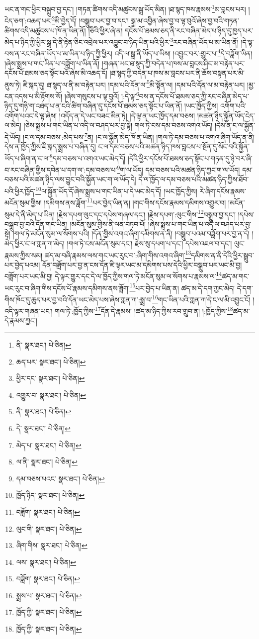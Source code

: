 ཡང་ན་གང་ཕྱིར་བསྒྲུབ་བྱ་དང་། །གཏན་ཚིགས་འདི་མཚུངས་སྒྲ་ཡོད་མིན། །ཐ་སྙད་ཁས་རྣམས་\footnote{ནི་  སྣར་ཐང་།  པེ་ཅིན། }མ་བླངས་པར། །ངེད་ཅག་:འཆད་པར་\footnote{ཆད་པར་  སྣར་ཐང་།  པེ་ཅིན། }མི་བྱེད་དོ། །བསྒྲུབ་པར་བྱ་བ་དང་། སྒྲ་མ་འབྱིན་ཞེས་བྱ་བ་ལྟ་བུའོ་ཞེས་བྱ་བའི་གཏན་ཚིགས་འདི་མཚུངས་པ་ཁོ་ན་ཡིན་ནོ། །ཅིའི་ཕྱིར་ཞེ་ན། དངོས་པོ་ཐམས་ཅད་ནི་རང་བཞིན་མེད་པ་ཉིད་དུ་ཁྱད་པར་མེད་པ་ཉིད་ཀྱི་ཕྱིར་སྒྲ་དེ་ནི་རྟེན་ཅིང་འབྲེལ་པར་འབྱུང་བ་ཉིད་ཡིན་པའི་ཕྱིར་\footnote{ཕྱིར་དང་  སྣར་ཐང་།  པེ་ཅིན། }རང་བཞིན་ཡོད་པ་མ་ཡིན་ནོ། །དེ་ལྟ་བས་ན་རང་བཞིན་ཡོད་པ་མ་ཡིན་པ་ཉིད་ཀྱི་ཕྱིར། འདི་ལ་སྒྲ་ནི་ཡོད་པ་ཡིས། །འབྱུང་བར་:གྱུར་པ་\footnote{འགྱུར་བ་  སྣར་ཐང་།  པེ་ཅིན། }དེ་བཟློག་ཡིན། །ཞེས་སྨྲས་པ་གང་ཡིན་པ་བཟློག་པ་ཡིན་ནོ། །གཞན་ཡང་ཐ་སྙད་ཀྱི་བདེན་པ་ཁས་མ་བླངས་ཤིང་མ་བརྟེན་པར་དངོས་པོ་ཐམས་ཅད་སྟོང་པའོ་ཞེས་མི་འཆད་དོ། །ཐ་སྙད་ཀྱི་བདེན་པ་ཁས་མ་བླངས་པར་ནི་ཆོས་བསྟན་པར་མི་ནུས་ཏེ། ཇི་སྐད་དུ། ཐ་སྙད་ལ་ནི་མ་བརྟེན་པར། །དམ་པའི་དོན་ལ་\footnote{ནི་  སྣར་ཐང་།  པེ་ཅིན། }མི་སྟོན་ལ། །དམ་པའི་དོན་ལ་མ་བརྟེན་པར། །མྱ་ངན་འདས་པ་མི་རྟོགས་སོ། །ཞེས་གསུངས་པ་ལྟ་བུའོ། །:དེ་ལྟ་\footnote{དེ་  སྣར་ཐང་།  པེ་ཅིན། }བས་ན་དངོས་པོ་ཐམས་ཅད་ཀྱི་རང་བཞིན་མེད་པ་ཉིད་དུ་གཉི་ག་འཐད་པ་ན་ངའི་ཚིག་བཞིན་དུ་དངོས་པོ་ཐམས་ཅད་སྟོང་པ་ཡིན་ནོ། །ཡང་ཁྱོད་ཀྱིས། འགོག་པའི་འགོག་པའང་དེ་ལྟ་ཞེས། །འདོད་ན་དེ་ཡང་བཟང་མིན་ཏེ། །དེ་ལྟ་ན་ཡང་ཁྱོད་དམ་བཅས། །མཚན་ཉིད་སྐྱོན་ཡོད་ངེད་ལ་མེད། །ཅེས་སྨྲས་པ་གང་ཡིན་པ་འདི་ལ་བཤད་པར་བྱ་སྟེ། གལ་ཏེ་ངས་དམ་བཅས་འགའ་ཡོད། །དེས་ན་ང་ལ་སྐྱོན་དེ་ཡོད། །ང་ལ་དམ་བཅས་:མེད་པས་\footnote{མེད་པ་  སྣར་ཐང་།  པེ་ཅིན། }ན། །ང་ལ་སྐྱོན་མེད་ཁོ་ན་ཡིན། །གལ་ཏེ་དམ་བཅས་པ་འགའ་ཞིག་ཡོད་ན་ནི། དེས་ན་ཁྱོད་ཀྱིས་ཇི་སྐད་སྨྲས་པ་བཞིན་དུ། ང་ལ་དམ་བཅས་པའི་མཚན་ཉིད་ཁས་བླངས་པ་སྔོན་དུ་སོང་བའི་སྐྱོན་ཡོད་པ་ཞིག་ན་ང་ལ་\footnote{ལ་ནི་  སྣར་ཐང་།  པེ་ཅིན། }དམ་བཅས་པ་འགའ་ཡང་མེད་དོ། །དེའི་ཕྱིར་དངོས་པོ་ཐམས་ཅད་སྟོང་པ་གཏན་དུ་ཉེ་བར་ཞི་བ་རང་བཞིན་གྱིས་དབེན་པ་དག་ལ་:དམ་བཅས་པ་\footnote{དམ་བཅས་པའང་  སྣར་ཐང་།  པེ་ཅིན། }ག་ལ་ཡོད། དམ་བཅས་པའི་མཚན་ཉིད་ཀྱང་ག་ལ་ཡོད། དམ་བཅས་པའི་མཚན་ཉིད་ལས་བྱུང་བའི་སྐྱོན་ཡང་ག་ལ་ཡོད་དེ། དེ་ལ་ཁྱོད་ལ་དམ་བཅས་པའི་མཚན་ཉིད་ཀྱིས་ཐོབ་པའི་ཕྱིར་ཁྱོད་\footnote{ཁྱོད་ཉིད་  སྣར་ཐང་།  པེ་ཅིན། }ལ་སྐྱོན་ཡོད་དོ་ཞེས་སྨྲས་པ་གང་ཡིན་པ་དེ་ཡང་མེད་དོ། །ཡང་ཁྱོད་ཀྱིས། རེ་ཞིག་དངོས་རྣམས་མངོན་སུམ་གྱིས། །དམིགས་ནས་ཟློག་\footnote{བཟློག་  སྣར་ཐང་།  པེ་ཅིན། }པར་བྱེད་ཡིན་ན། །གང་གིས་དངོས་རྣམས་དམིགས་འགྱུར་བ། །མངོན་སུམ་དེ་ནི་མེད་པ་ཡིན། །རྗེས་དཔག་ལུང་དང་དཔེས་གཞལ་དང་། །རྗེས་དཔག་:ལུང་གིས་\footnote{ལུང་གི་  སྣར་ཐང་།  པེ་ཅིན། }བསྒྲུབ་བྱ་དང་། །དཔེས་བསྒྲུབ་བྱ་བའི་དོན་གང་ཡིན། །མངོན་སུམ་གྱིས་ནི་ལན་བཏབ་པོ། །ཞེས་སྨྲས་པ་གང་ཡིན་པ་འདི་ལ་བཤད་པར་བྱ་སྟེ། །གལ་ཏེ་མངོན་སུམ་ལ་སོགས་པའི། །དོན་གྱིས་འགའ་ཞིག་དམིགས་ན་ནི། །བསྒྲུབ་པའམ་བཟློག་པར་བྱ་ན་དེ། །མེད་ཕྱིར་ང་ལ་ཀླན་ཀ་མེད། །གལ་ཏེ་ངས་མངོན་སུམ་དང་། རྗེས་སུ་དཔག་པ་དང་། དཔེས་འཇལ་བ་དང་། ལུང་རྣམས་ཀྱིས་སམ། ཚད་མ་བཞི་རྣམས་ལས་གང་ཡང་རུང་བ་:ཞིག་གིས་འགའ་ཞིག་\footnote{ཞིག་གིས་  སྣར་ཐང་།  པེ་ཅིན། }དམིགས་ན་ནི་དེའི་ཕྱིར་སྒྲུབ་པར་བྱེད་པའམ། དོན་བཟློག་པར་བྱ་ན་ངས་དོན་ཇི་ལྟར་ཡང་མ་དམིགས་པས་དེའི་ཕྱིར་བསྒྲུབ་པར་ཡང་མི་བྱ། བཟློག་པར་ཡང་མི་བྱ། དེ་ལྟར་གྱུར་དང་དེ་ལ་ཁྱོད་ཀྱིས་གལ་ཏེ་མངོན་སུམ་ལ་སོགས་པ་རྣམས་ལ་\footnote{ལས་  སྣར་ཐང་།  པེ་ཅིན། }ཚད་མ་གང་ཡང་རུང་བ་ཞིག་གིས་དངོས་པོ་རྣམས་དམིགས་ནས་ཟློག་\footnote{བཟློག་  སྣར་ཐང་།  པེ་ཅིན། }པར་བྱེད་པ་ཡིན་ན། ཚད་མ་དེ་དག་ཀྱང་མེད། དེ་དག་གིས་ཁོང་དུ་ཆུད་པར་བྱ་བའི་དོན་ཡང་མེད་པས་ཞེས་ཀླན་ཀ་:སྨྲ་བ་\footnote{སྨྲས་པ་  སྣར་ཐང་།  པེ་ཅིན། }གང་ཡིན་པའི་ཀླན་ཀ་དེ་ང་ལ་མི་འབྱུང་ངོ། །འདི་ལྟར་གཞན་ཡང་། གལ་ཏེ་:ཁྱོད་ཀྱིས་\footnote{ཁྱོད་ཀྱི་  སྣར་ཐང་།  པེ་ཅིན། }དོན་དེ་རྣམས། །ཚད་མ་ཉིད་ཀྱིས་རབ་གྲུབ་ན། །:ཁྱོད་ཀྱིས་\footnote{ཁྱོད་ཀྱི་  སྣར་ཐང་།  པེ་ཅིན། }ཚད་མ་དེ་རྣམས་ཀྱང་། 